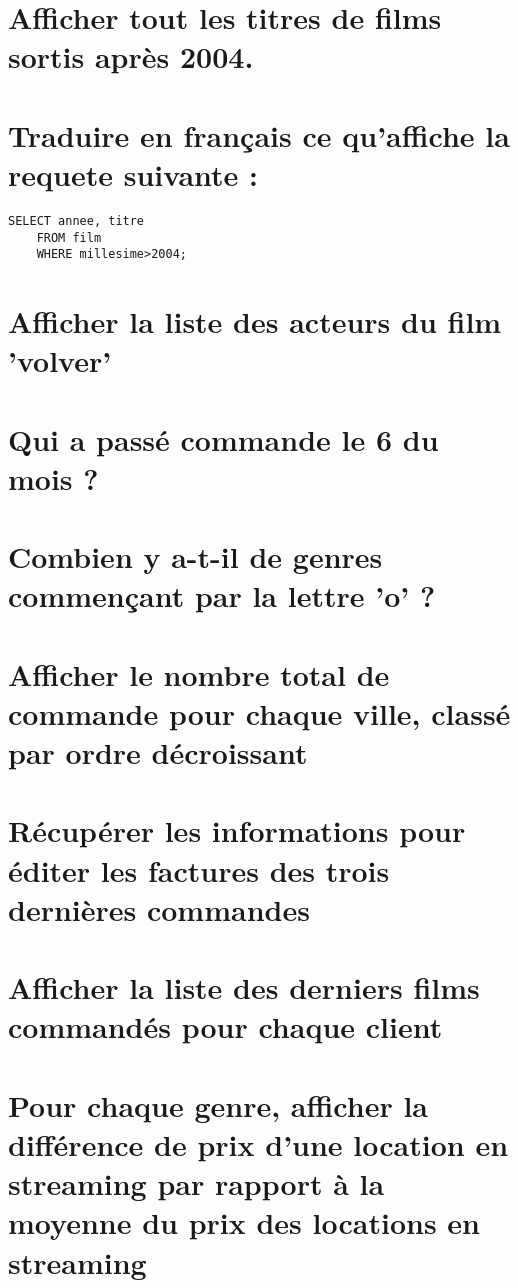 \documentclass[]{scrartcl}
\title{}
\author{}
\begin{document}
\lstset{language=sql}   

\section{Afficher tout les titres de films sortis après 2004.}
	

\section{Traduire en français ce qu'affiche la requete suivante :}

\begin{lstlisting}[frame=single]  
	SELECT annee, titre 
	FROM film
	WHERE millesime>2004;
\end{lstlisting}

\section{Afficher la liste des acteurs du film 'volver'}

\section{Qui a passé commande le 6 du mois ?}

\section{Combien y a-t-il de genres commençant par la lettre 'o' ?}

\section{Afficher le nombre total de commande pour chaque ville, classé par ordre décroissant}

\section{Récupérer les informations pour éditer les factures des trois dernières commandes}

\section{Afficher la liste des derniers films commandés pour chaque client}

\section{Pour chaque genre, afficher la différence de prix d'une location en streaming par rapport à la moyenne du prix des locations en streaming}
\end{document}
